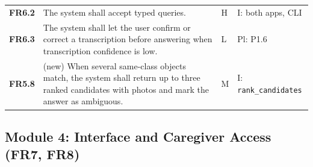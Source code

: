 \begin{ltab}
\begin{longtable}{@{}>{\bfseries}L{1.2cm}L{9.6cm}L{0.8cm}L{3.0cm}@{}}
FR6.2 & The system shall accept typed queries. & H & I: both apps, CLI\\
FR6.3 & The system shall let the user confirm or correct a transcription before
answering when transcription confidence is low. & L & Pl: P1.6\\
FR5.8 & (new) When several same-class objects match, the system shall return up to three ranked candidates with photos and mark the answer as ambiguous. & M & I: \texttt{rank\_candidates}\\
\end{longtable}
\end{ltab}

\subsection{Module 4: Interface and Caregiver Access (FR7, FR8)}
